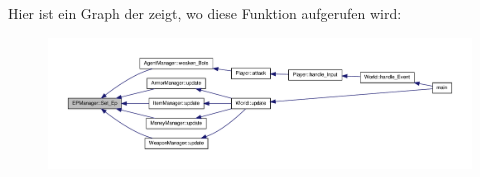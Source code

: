 Hier ist ein Graph der zeigt, wo diese Funktion aufgerufen wird\-:\nopagebreak
\begin{figure}[H]
\begin{center}
\leavevmode
\includegraphics[width=350pt]{class_e_p_manager_a300554dc6cd44d47ece8ebe6d8ed2daa_icgraph}
\end{center}
\end{figure}




